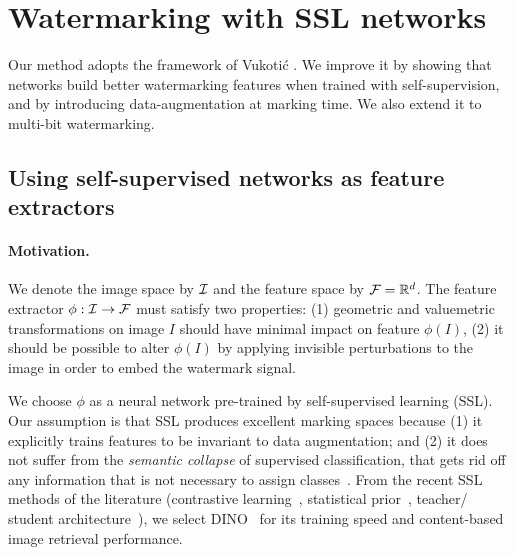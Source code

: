 
\section{Watermarking with SSL networks}\label{chap1/section:0bit}

Our method adopts the framework of Vukoti\'c \etal\citep{vukotic2020classification}. 
We improve it by showing that networks build better watermarking features when trained with self-supervision, and by introducing data-augmentation at marking time. 
We also extend it to multi-bit watermarking.


\subsection{Using self-supervised networks as feature extractors}\label{chap1/subsec:ssl_as_feature_extractor}


\paragraph*{Motivation.}
We denote the image space by $\mathcal{I}$ and the feature space by $\mathcal{F}=\mathbb{R}^d$.
The feature extractor $\phi:\mathcal{I}\to\mathcal{F}$ must satisfy two properties: 
(1) geometric and valuemetric transformations on image $I$ should have minimal impact on feature $\phi(I)$,
(2) it should be possible to alter $\phi(I)$ by applying invisible perturbations to the image in order to embed the watermark signal.

We choose $\phi$ as a neural network pre-trained by self-supervised learning (SSL).
Our assumption is that SSL produces excellent marking spaces because 
(1) it explicitly trains features to be invariant to data augmentation; and 
(2) it does not suffer from the \textit{semantic collapse} of supervised classification, that gets rid off any information that is not necessary to assign classes~\citep{doersch2020crosstransformers}. 
From the recent SSL methods of the literature (contrastive learning~\citep{chen2020simclr,he2020moco}, statistical prior~\citep{zbontar2021barlow}, teacher/ student architecture~\citep{grill2020byol}), we select DINO~\citep{caron2021dino} for its training speed and content-based image retrieval performance.


